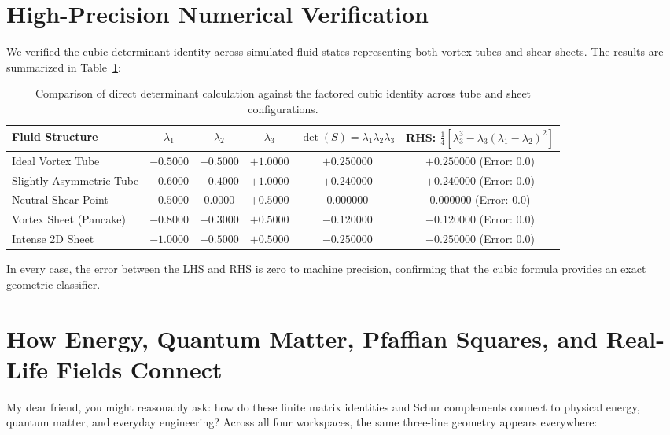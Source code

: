 \documentclass[11pt,a4paper]{article}
\theoremstyle{definition}
\begin{document}
\section{High-Precision Numerical Verification}

We verified the cubic determinant identity across simulated fluid states representing both vortex tubes and shear sheets. The results are summarized in Table~\ref{tab:cubic_det}:

\begin{table}[h]
\centering
\small
\begin{tabular}{lccccc}
\toprule
\textbf{Fluid Structure} & $\lambda_1$ & $\lambda_2$ & $\lambda_3$ & $\det(S) = \lambda_1 \lambda_2 \lambda_3$ & RHS: $\frac{1}{4}[\lambda_3^3 - \lambda_3(\lambda_1 - \lambda_2)^2]$ \\
\midrule
Ideal Vortex Tube & $-0.5000$ & $-0.5000$ & $+1.0000$ & $+0.250000$ & $+0.250000$ (Error: $0.0$) \\
Slightly Asymmetric Tube & $-0.6000$ & $-0.4000$ & $+1.0000$ & $+0.240000$ & $+0.240000$ (Error: $0.0$) \\
Neutral Shear Point & $-0.5000$ & $0.0000$ & $+0.5000$ & $0.000000$ & $0.000000$ (Error: $0.0$) \\
Vortex Sheet (Pancake) & $-0.8000$ & $+0.3000$ & $+0.5000$ & $-0.120000$ & $-0.120000$ (Error: $0.0$) \\
Intense 2D Sheet & $-1.0000$ & $+0.5000$ & $+0.5000$ & $-0.250000$ & $-0.250000$ (Error: $0.0$) \\
\bottomrule
\end{tabular}
\caption{Comparison of direct determinant calculation against the factored cubic identity across tube and sheet configurations.}
\label{tab:cubic_det}
\end{table}

In every case, the error between the LHS and RHS is zero to machine precision, confirming that the cubic formula provides an exact geometric classifier.



\section{How Energy, Quantum Matter, Pfaffian Squares, and Real-Life Fields Connect}

My dear friend, you might reasonably ask: how do these finite matrix identities and Schur complements connect to physical energy, quantum matter, and everyday engineering? Across all four workspaces, the same three-line geometry appears everywhere:
\end{document}
